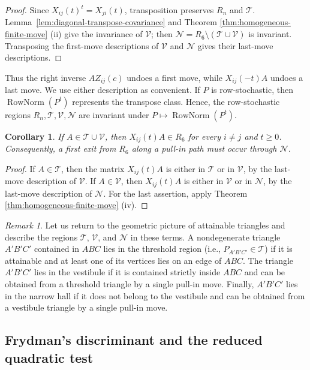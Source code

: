 \documentclass[11pt,onecolumn]{amsart}
\theoremstyle{plain}
\newtheorem{corollary}[theorem]{Corollary}
\theoremstyle{definition}
\theoremstyle{remark}
\newtheorem{remark}[theorem]{Remark}
\newcommand{\RowNorm}{\operatorname{RowNorm}}
\newcommand{\T}{\mathcal T}
\newcommand{\V}{\mathcal V}
\newcommand{\NH}{\mathcal N}
\begin{document}
\begin{proof}
Since $X_{ij}(t)^t=X_{ji}(t)$, transposition preserves $R_n$
and $\T$.  Lemma~\ref{lem:diagonal-transpose-covariance} and
Theorem \ref{thm:homogeneous-finite-move} (ii) give the invariance of $\V$;
then $\NH=R_6\setminus(\T\cup\V)$ is invariant.  Transposing the
first-move descriptions of $\V$ and $\NH$ gives their last-move descriptions.
\end{proof}

Thus the right inverse $AZ_{ij}(c)$ undoes a first move, while
$X_{ij}(-t)A$ undoes a last move.  We use either description as
convenient. If $P$ is row-stochastic, then $\RowNorm(P^t)$ represents the
transpose class.  Hence, the row-stochastic regions $R_n,\T,\V,\NH$ are invariant under
$P\mapsto\RowNorm(P^t)$.


\begin{corollary}
\label{cor:no-exit-vestibule}
If $A\in\T\cup \V$, then $X_{ij}(t)A\in R_6$ for every $i\neq j$ and
$t\geq0$.  Consequently, a first exit from $R_6$ along a pull-in path
must occur through $\NH$.
\end{corollary}

\begin{proof}
If $A\in \T$, then 	
the matrix $X_{ij}(t)A$ is either in $\T$ or in $\V$, by the last-move description of $\V$. 
If $A\in \V$, then $X_{ij}(t)A$ is either in $\V$ or in $\NH$, by the last-move
description of $\NH$.  For the last assertion, apply
Theorem \ref{thm:homogeneous-finite-move} (iv).  
\end{proof}

\begin{remark}
	Let us return to the geometric picture of attainable triangles and describe
	the regions $\T$, $\V$, and $\NH$ in these terms.
	A nondegenerate triangle
	$A'B'C'$ contained in $ABC$ lies in the threshold region
	(i.e., $P_{A'B'C'}\in\T$) if it is attainable and at least one of its
	vertices lies on an edge of $ABC$.
	The triangle $A'B'C'$ lies in the vestibule if it is contained strictly
	inside $ABC$ and can be obtained from a threshold triangle by a single
	pull-in move. Finally, $A'B'C'$ lies in the narrow hall if it does not
	belong to the vestibule and can be obtained from a vestibule triangle
	by a single pull-in move.
\end{remark}


\subsection{Frydman's discriminant and the reduced quadratic test}
\end{document}
